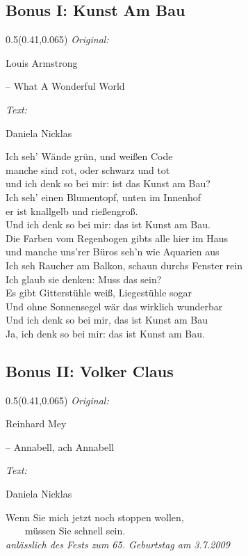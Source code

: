 \documentclass[11pt,a5paper]{article}
\newcommand\songinfo[2]{\begin{textblock}{0.5}(0.41,0.065)
		\footnotesize
		\hfill \textit{Original:} \ \ \ \ \ \ \ \ \ \ \ \ \ \ \ \ \ \ \ \ 
		
		\hfill #1
		
		\hfill  \textit{Text:} \ \ \ \ \ \ \ \ \ \ \ \ \ \ \ \ \ \ \ \ 
		
		\hfill #2
	\end{textblock}}
\begin{document}
			\pagebreak
			\subsection{Bonus I: Kunst Am Bau}
			\songinfo{Louis Armstrong 
				
				\hfill -- What A Wonderful World}{Daniela Nicklas}
			Ich seh' Wände grün, und weißen Code \\
			manche sind rot, oder schwarz und tot \\
			und ich denk so bei mir: ist das Kunst am Bau? \\
			
			Ich seh' einen Blumentopf, unten im Innenhof \\
			er ist knallgelb und rießengroß. \\
			Und ich denk so bei mir: das ist Kunst am Bau. \\
			
			Die Farben vom Regenbogen gibts alle hier im Haus \\
			und manche uns'rer Büros seh'n wie Aquarien aus \\
			Ich seh Raucher am Balkon, schaun durchs Fenster rein \\
			Ich glaub sie denken: \glqq Muss das sein?\grqq \\
			
			Es gibt Gitterstühle weiß, Liegestühle sogar \\
			Und ohne Sonnensegel wär das wirklich wunderbar \\
			Und ich denk so bei mir, das ist Kunst am Bau \\
			Ja, ich denk so bei mir: das ist Kunst am Bau. \\
			\pagebreak
			\subsection{Bonus II: Volker Claus}
			\songinfo{Reinhard Mey 
				
				\hfill -- Annabell, ach Annabell}{Daniela Nicklas}
			
			\glqq Wenn Sie mich jetzt noch stoppen wollen, \\ \ \ \ \ müssen Sie schnell sein.\grqq \\
			\textit{anlässlich des Fests zum 65. Geburtstag am 3.7.2009} \\
			
\end{document}
